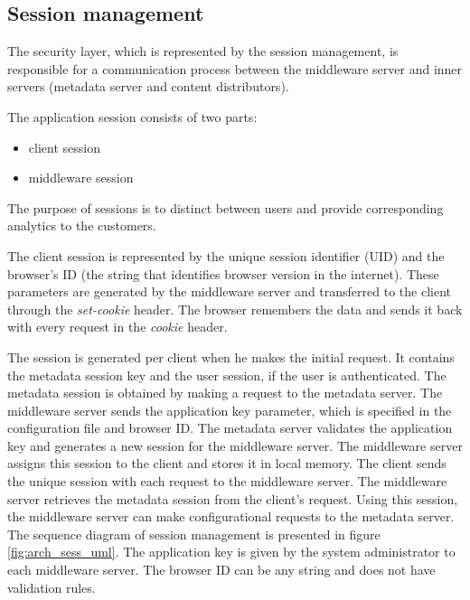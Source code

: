 \subsection{Session management}

The security layer, which is represented by the session management, is responsible for a communication process between the middleware server and inner servers (metadata server and content distributors).

The application session consists of two parts: 

\begin{itemize}
	\item client session
	\item middleware session
\end{itemize}

The purpose of sessions is to distinct between users and provide corresponding analytics to the customers.

The client session is represented by the unique session identifier (UID) and the browser's ID (the string that identifies browser version in the internet). These parameters are generated by the middleware server and transferred to the client through the \textit{set-cookie} header. The browser remembers the data and sends it back with every request in the \textit{cookie} header.


The session is generated per client when he makes the initial request. It contains the metadata session key and the user session, if the user is authenticated. The metadata session is obtained by making a request to the metadata server. The middleware server sends the application key parameter, which is specified in the configuration file and browser ID. The metadata server validates the application key and generates a new session for the middleware server. The middleware server assigns this session to the client and stores it in local memory. The client sends the unique session with each request to the middleware server. The middleware server retrieves the metadata session from the client's request. Using this session, the middleware server can make configurational requests to the metadata server. The sequence diagram of session management is presented in figure \ref{fig:arch_sess_uml}. The application key is given by the system administrator to each middleware server. The browser ID can be any string and does not have validation rules.

